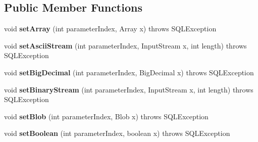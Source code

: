 \subsection*{Public Member Functions}
\begin{DoxyCompactItemize}
\item 
\mbox{\label{classcom_1_1mysql_1_1jdbc_1_1jdbc2_1_1optional_1_1_prepared_statement_wrapper_a03e1f7c98b4bbc0864aa2c9c402734a6}} 
void {\bfseries set\+Array} (int parameter\+Index, Array x)  throws S\+Q\+L\+Exception 
\item 
\mbox{\label{classcom_1_1mysql_1_1jdbc_1_1jdbc2_1_1optional_1_1_prepared_statement_wrapper_a92a9e587fe5cf49bf30a0181c68c22f6}} 
void {\bfseries set\+Ascii\+Stream} (int parameter\+Index, Input\+Stream x, int length)  throws S\+Q\+L\+Exception 
\item 
\mbox{\label{classcom_1_1mysql_1_1jdbc_1_1jdbc2_1_1optional_1_1_prepared_statement_wrapper_aae3e968454350344c1800c78a5455024}} 
void {\bfseries set\+Big\+Decimal} (int parameter\+Index, Big\+Decimal x)  throws S\+Q\+L\+Exception 
\item 
\mbox{\label{classcom_1_1mysql_1_1jdbc_1_1jdbc2_1_1optional_1_1_prepared_statement_wrapper_ae645a0e84f06747704e613253229e0ae}} 
void {\bfseries set\+Binary\+Stream} (int parameter\+Index, Input\+Stream x, int length)  throws S\+Q\+L\+Exception 
\item 
\mbox{\label{classcom_1_1mysql_1_1jdbc_1_1jdbc2_1_1optional_1_1_prepared_statement_wrapper_a996f2eec625b13d1728968b72067be79}} 
void {\bfseries set\+Blob} (int parameter\+Index, Blob x)  throws S\+Q\+L\+Exception 
\item 
\mbox{\label{classcom_1_1mysql_1_1jdbc_1_1jdbc2_1_1optional_1_1_prepared_statement_wrapper_a8d85ea99bdbfa973665a4d275de8b59f}} 
void {\bfseries set\+Boolean} (int parameter\+Index, boolean x)  throws S\+Q\+L\+Exception 

\end{DoxyCompactItemize}
